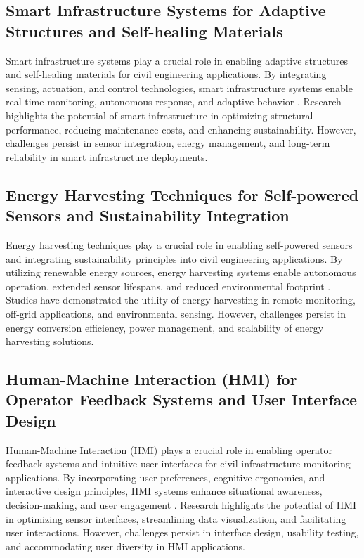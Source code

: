 \documentclass[journal, a4paper]{IEEEtran}
\begin{document}
\subsection{Smart Infrastructure Systems for Adaptive Structures and Self-healing Materials}
Smart infrastructure systems play a crucial role in enabling adaptive structures and self-healing
materials for civil engineering applications. By integrating sensing, actuation, and control technologies,
smart infrastructure systems enable real-time monitoring, autonomous response, and adaptive behavior \cite{wang_fatigue_2023} \cite{yifei_structure_2023} \cite{bevan_automated_2022}.
Research highlights the potential of smart infrastructure in optimizing structural performance, reducing maintenance costs,
and enhancing sustainability. However, challenges persist in sensor integration, energy management, and long-term reliability
in smart infrastructure deployments.

\subsection{Energy Harvesting Techniques for Self-powered Sensors and Sustainability Integration}
Energy harvesting techniques play a crucial role in enabling self-powered sensors and integrating sustainability
principles into civil engineering applications. By utilizing renewable energy sources, energy harvesting systems
enable autonomous operation, extended sensor lifespans, and reduced environmental footprint \cite{han_crack_2021} \cite{yifei_structure_2023} \cite{bevan_automated_2022}.
Studies have demonstrated the utility of energy harvesting in remote monitoring, off-grid applications,
and environmental sensing. However, challenges persist in energy conversion efficiency, power management,
and scalability of energy harvesting solutions.

\subsection{Human-Machine Interaction (HMI) for Operator Feedback Systems and User Interface Design}
Human-Machine Interaction (HMI) plays a crucial role in enabling operator feedback systems and intuitive
user interfaces for civil infrastructure monitoring applications. By incorporating user preferences, cognitive
ergonomics, and interactive design principles, HMI systems enhance situational awareness, decision-making,
and user engagement \cite{yifei_structure_2023} \cite{bevan_automated_2022}. Research highlights the potential of HMI in optimizing sensor interfaces,
streamlining data visualization, and facilitating user interactions. However, challenges persist in interface
design, usability testing, and accommodating user diversity in HMI applications.
\end{document}

